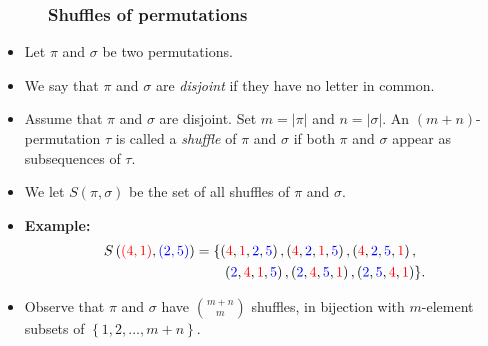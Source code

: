 \documentclass{beamer}
\newcommand{\red}{\color{red}}
\newcommand{\blue}{\color{blue}}
\newcommand{\fti}[1]{\frametitle{\ \ \ \ \ #1}}
\newcommand{\set}[1]{\left\{ #1 \right\}}
\newcommand{\abs}[1]{\left| #1 \right|}
\newcommand{\tup}[1]{\left( #1 \right)}
\newcommand{\defn}[1]{{\color{darkred}\emph{#1}}} %
\theoremstyle{plain}
\begin{document}
\begin{frame}
\fti{Shuffles of permutations}

\begin{itemize}

\item Let $\pi$ and $\sigma$ be two permutations.

\item We say that $\pi$ and $\sigma$ are \defn{disjoint} if they have
      no letter in common.

\pause

\item Assume that $\pi$ and $\sigma$ are disjoint. Set
      $m = \abs{\pi}$ and $n = \abs{\sigma}$.
      An $\tup{m+n}$-permutation $\tau$ is called a \defn{shuffle} of
      $\pi$ and $\sigma$ if both $\pi$ and $\sigma$ appear as
      subsequences of $\tau$.

\item We let $S \tup{\pi, \sigma}$ be the set of all shuffles
      of $\pi$ and $\sigma$.

\item \textbf{Example:}
      \begin{align*}
      S \tup{ {\red \tup{4, 1}} , {\blue \tup{2, 5}} }
      &= \{ \tup{ {\red 4}, {\red 1}, {\blue 2}, {\blue 5} } ,
            \tup{ {\red 4}, {\blue 2}, {\red 1}, {\blue 5} } ,
            \tup{ {\red 4}, {\blue 2}, {\blue 5}, {\red 1} } , \\
      & \qquad
            \tup{ {\blue 2}, {\red 4}, {\red 1}, {\blue 5} } ,
            \tup{ {\blue 2}, {\red 4}, {\blue 5}, {\red 1} } ,
            \tup{ {\blue 2}, {\blue 5}, {\red 4}, {\red 1} }  \} .
      \end{align*}

\pause

\item Observe that $\pi$ and $\sigma$ have $\binom{m+n}{m}$
      shuffles, in bijection with $m$-element subsets of
      $\set{1, 2, \ldots, m+n}$.

\end{itemize}
\end{frame}
\end{document}
